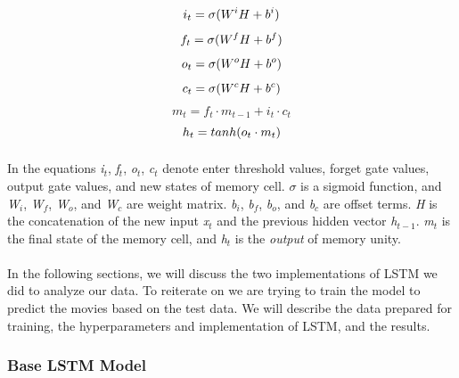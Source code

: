 \begin{equation}
\label{eq:lstm_1}
    i_{t} = \sigma \small(W^iH + b^i)
\end{equation}
\begin{equation}
\label{eq:lstm_2}
    f_{t} = \sigma \small(W^fH + b^f)
\end{equation}
\begin{equation}
\label{eq:lstm_3}
    o_{t} = \sigma \small(W^oH + b^o)
\end{equation}
\begin{equation}
\label{eq:lstm_4}
    c_{t} = \sigma \small(W^cH + b^c)
\end{equation}
\begin{equation}
\label{eq:lstm_5}
    m_{t} = f_{t}\cdot m_{t-1} + i_{t}\cdot c_{t}
\end{equation}
\begin{equation}
\label{eq:lstm_6}
    h_{t} = tanh\small(o_{t}\cdot m_{t})
\end{equation}


\paragraph{} In the equations \textit{i$_{t}$}, \textit{f$_{t}$}, \textit{o$_{t}$}, \textit{c$_{t}$} denote enter threshold values, forget gate values, output gate values, and new states of memory cell. $\sigma$ is a sigmoid function, and \textit{W$_{i}$}, \textit{W$_{f}$}, \textit{W$_{o}$}, and \textit{W$_{c}$} are weight matrix. \textit{b$_{i}$}, \textit{b$_{f}$}, \textit{b$_{o}$}, and \textit{b$_{c}$} are offset terms. \textit{H} is the concatenation of the new input \textit{x$_{t}$} and the previous hidden vector \textit{h$_{t-1}$}. \textit{m$_{t}$} is the final state of the memory cell, and \textit{h$_{t}$} is the \textit{output} of memory unity.

\paragraph{} In the following sections, we will discuss the two implementations of LSTM we did to analyze our data. To reiterate on we are trying to train the model to predict the movies based on the test data. We will describe the data prepared for training, the hyperparameters and implementation of LSTM, and the results.

\subsubsection{Base LSTM Model}
\label{sec:lstm_base_model}
